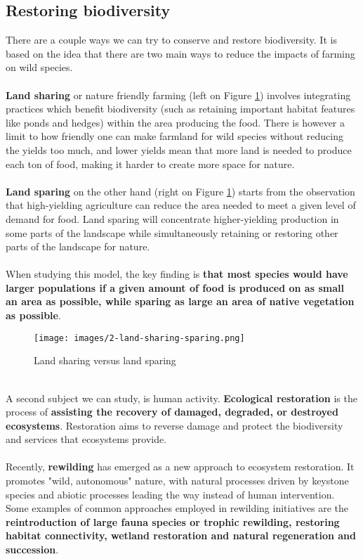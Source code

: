 \documentclass[../summary.tex]{subfiles}
\begin{document}
	\subsection{Restoring biodiversity}
	There are a couple ways we can try to conserve and restore biodiversity. It is based on the idea that there are two main ways to reduce the impacts of farming on wild species.
	\\\\
	\textbf{Land sharing} or nature friendly farming (left on Figure \ref{fig:land-sharing-sparing}) involves integrating practices which benefit biodiversity (such as retaining important habitat features like ponds and hedges) within the area producing the food. There is however a limit to how friendly one can make farmland for wild species without reducing the yields too much, and lower yields mean that more land is needed to produce each ton of food, making it harder to create more space for nature.
	\\\\
	\textbf{Land sparing} on the other hand (right on Figure \ref{fig:land-sharing-sparing}) starts from the observation that high-yielding agriculture can reduce the area needed to meet a given level of demand for food. Land sparing will concentrate higher-yielding production in some parts of the landscape while simultaneously retaining or restoring other parts of the landscape for nature.
	\\
	\\
	When studying this model, the key finding is \textbf{that most species would have larger populations if a given amount of food is produced on as small an area as possible, while sparing as large an area of native vegetation as possible}.
	\\
	\begin{figure}[htbp]
		\centering
		\texttt{[image: images/2-land-sharing-sparing.png]}
		\caption{Land sharing versus land sparing}
		\label{fig:land-sharing-sparing}
	\end{figure}
	\ \\
	A second subject we can study, is human activity. \textbf{Ecological restoration} is the process of \textbf{assisting the recovery of damaged, degraded, or destroyed ecosystems}. Restoration aims to reverse damage and protect the biodiversity and services that ecosystems provide.
	\\
	\\
	Recently, \textbf{rewilding} has emerged as a new approach to ecosystem restoration. It promotes "wild, autonomous" nature, with natural processes driven by keystone species and abiotic processes leading the way instead of human intervention. Some examples of common approaches employed in rewilding initiatives are the \textbf{reintroduction of large fauna species or trophic rewilding, restoring habitat connectivity, wetland restoration and natural regeneration and succession}.
	
\end{document}
